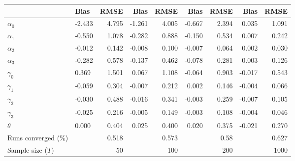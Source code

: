 
\begin{tabular}[t]{llrrrrrrr}
\toprule
  & Bias & RMSE & Bias & RMSE & Bias & RMSE & Bias & RMSE\\
\midrule
$\alpha_{0}$ & -2.433 & 4.795 & -1.261 & 4.005 & -0.667 & 2.394 & 0.035 & 1.091\\
$\alpha_{1}$ & -0.550 & 1.078 & -0.282 & 0.888 & -0.150 & 0.534 & 0.007 & 0.242\\
$\alpha_{2}$ & -0.012 & 0.142 & -0.008 & 0.100 & -0.007 & 0.064 & 0.002 & 0.030\\
$\alpha_{3}$ & -0.282 & 0.578 & -0.137 & 0.462 & -0.078 & 0.281 & 0.003 & 0.126\\
$\gamma_{0}$ & 0.369 & 1.501 & 0.067 & 1.108 & -0.064 & 0.903 & -0.017 & 0.543\\
$\gamma_{1}$ & -0.059 & 0.304 & -0.007 & 0.212 & 0.002 & 0.146 & -0.004 & 0.066\\
$\gamma_{2}$ & -0.030 & 0.488 & -0.016 & 0.341 & -0.003 & 0.259 & -0.007 & 0.105\\
$\gamma_{3}$ & -0.025 & 0.216 & -0.005 & 0.149 & -0.003 & 0.108 & -0.004 & 0.046\\
$\theta$ & 0.000 & 0.404 & 0.025 & 0.400 & 0.020 & 0.375 & -0.021 & 0.270\\
Runs converged (\%) &  & 0.518 &  & 0.573 &  & 0.58 &  & 0.627\\
Sample size ($T$) &  & 50 &  & 100 &  & 200 &  & 1000\\
\bottomrule
\end{tabular}
